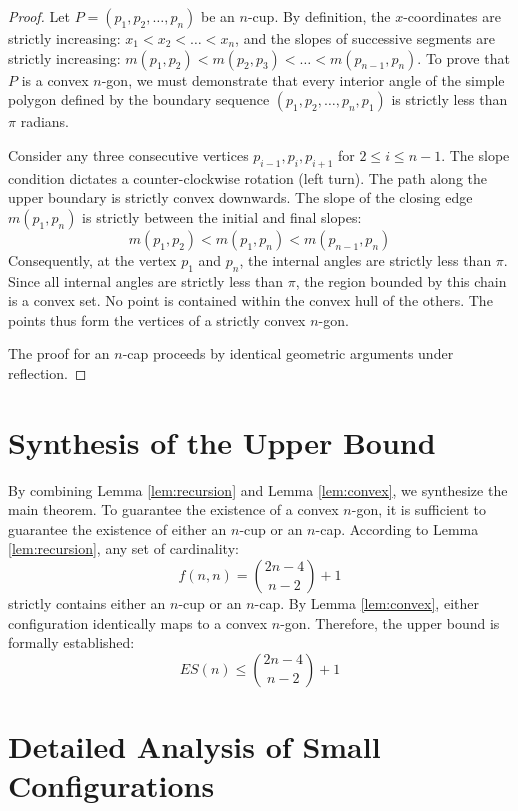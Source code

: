 \documentclass[11pt,a4paper]{article}
\begin{document}
\begin{proof}
Let $P = (p_1, p_2, \dots, p_n)$ be an $n$-cup. By definition, the $x$-coordinates are strictly increasing: $x_1 < x_2 < \dots < x_n$, and the slopes of successive segments are strictly increasing: $m(p_1, p_2) < m(p_2, p_3) < \dots < m(p_{n-1}, p_n)$.
To prove that $P$ is a convex $n$-gon, we must demonstrate that every interior angle of the simple polygon defined by the boundary sequence $(p_1, p_2, \dots, p_n, p_1)$ is strictly less than $\pi$ radians.

Consider any three consecutive vertices $p_{i-1}, p_i, p_{i+1}$ for $2 \le i \le n-1$. The slope condition dictates a counter-clockwise rotation (left turn). The path along the upper boundary is strictly convex downwards.
The slope of the closing edge $m(p_1, p_n)$ is strictly between the initial and final slopes:
\begin{equation}
m(p_1, p_2) < m(p_1, p_n) < m(p_{n-1}, p_n)
\end{equation}
Consequently, at the vertex $p_1$ and $p_n$, the internal angles are strictly less than $\pi$.
Since all internal angles are strictly less than $\pi$, the region bounded by this chain is a convex set. No point is contained within the convex hull of the others. The points thus form the vertices of a strictly convex $n$-gon.

The proof for an $n$-cap proceeds by identical geometric arguments under reflection.
\end{proof}

\section{Synthesis of the Upper Bound}
By combining Lemma \ref{lem:recursion} and Lemma \ref{lem:convex}, we synthesize the main theorem. To guarantee the existence of a convex $n$-gon, it is sufficient to guarantee the existence of either an $n$-cup or an $n$-cap.
According to Lemma \ref{lem:recursion}, any set of cardinality:
\begin{equation}
f(n, n) = \binom{2n-4}{n-2} + 1
\end{equation}
strictly contains either an $n$-cup or an $n$-cap. By Lemma \ref{lem:convex}, either configuration identically maps to a convex $n$-gon. Therefore, the upper bound is formally established:
\begin{equation}
ES(n) \le \binom{2n-4}{n-2} + 1
\end{equation}

\section{Detailed Analysis of Small Configurations}
\end{document}
